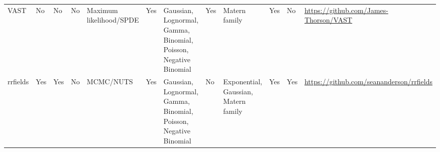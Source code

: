 \documentclass[12pt,english]{article}
\begin{document}
\begin{landscape}
\begin{table}
\begin{minipage}{\textwidth}
\begin{scriptsize}
\begin{tabular}{llllL{2cm}lL{2.4cm}lL{2.0cm}llL{2.0cm}}
        VAST     & No             & No      & No      & Maximum likelihood/SPDE     & Yes        & Gaussian, Lognormal, Gamma, Binomial, Poisson, Negative Binomial  & Yes      & Matern family                                     & Yes                   & No        & \url{https://github.com/James-Thorson/VAST}                      \\
        rrfields & Yes            & Yes     & No      & MCMC/NUTS                   & Yes        & Gaussian, Lognormal, Gamma, Binomial, Poisson, Negative Binomial  & No       & Exponential, Gaussian, Matern family              & Yes                   & Yes       & \url{https://github.com/seananderson/rrfields}                  \\
        \bottomrule
      \end{tabular}
    \end{scriptsize}
  \end{minipage}
  \end{table}
\end{landscape}
\end{document}
